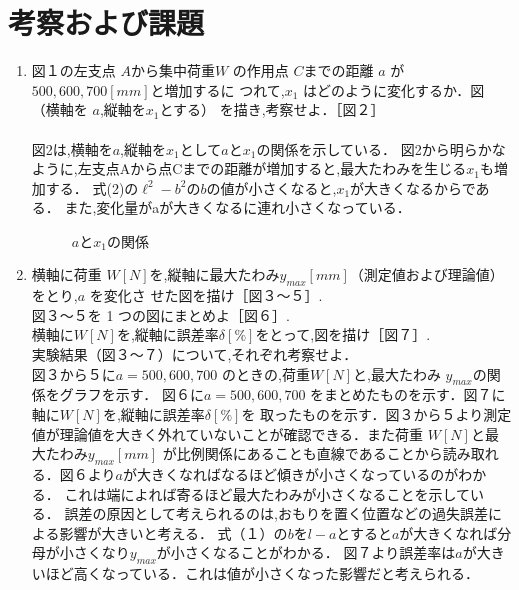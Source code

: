 \documentclass[a4paper,12pt]{jsarticle}
\begin{document}
\section{考察および課題}
\begin{enumerate}
  \item 図１の左支点 $A$から集中荷重$ W$ の作用点 $C $までの距離 $a$ が $500,600,700 [mm]$と増加するに
  つれて,$x_1$ はどのように変化するか．図（横軸を $a $,縦軸を$x_1$とする） を描き,考察せよ．［図２］\\
  \\
  \quad 図2は,横軸を$a$,縦軸を$x_1$として$a$と$x_1$の関係を示している．
  図2から明らかなように,左支点Aから点Cまでの距離が増加すると,最大たわみを生じる$x_1$も増加する．
  式(2)の$\ell^2-b^2$の$b$の値が小さくなると,$x_1$が大きくなるからである．
  また,変化量がaが大きくなるに連れ小さくなっている．

\clearpage
\begin{figure}[h]
  \centering
  \caption{$a$と$x_1$の関係}
\end{figure}
\clearpage

\item 横軸に荷重 $W [N] $を,縦軸に最大たわみ$ y_{max}[mm]$（測定値および理論値）をとり,$a$ を変化さ
せた図を描け［図３～５］.\\
図３～５を 1 つの図にまとめよ［図６］.\\
横軸に$ W [N]$を,縦軸に誤差率$ \delta [\%]$をとって,図を描け［図７］.\\
実験結果（図３～７）について,それぞれ考察せよ．\\
  
\quad 図３から５に$a = 500,600,700$ のときの,荷重$ W [N] $と,最大たわみ $y_{max}$の関係をグラフを示す．
図６に$a = 500,600,700$ をまとめたものを示す．図７に軸に$ W [N]$を,縦軸に誤差率$ \delta [\%]$を
取ったものを示す．図３から５より測定値が理論値を大きく外れていないことが確認できる．また荷重 $W [N] $と最大たわみ$ y_{max}[mm]$
が比例関係にあることも直線であることから読み取れる．図６より$a$が大きくなればなるほど傾きが小さくなっているのがわかる．
これは端によれば寄るほど最大たわみが小さくなることを示している．
誤差の原因として考えられるのは,おもりを置く位置などの過失誤差による影響が大きいと考える．
式（１）の$b$を$l-a$とすると$a$が大きくなれば分母が小さくなり$y_{max}$が小さくなることがわかる．
図７より誤差率は$a$が大きいほど高くなっている．これは値が小さくなった影響だと考えられる．


\end{enumerate}
\end{document}
